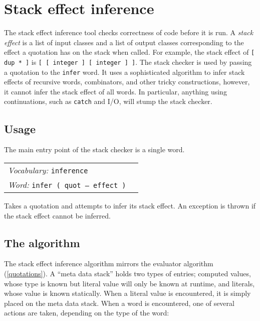 \documentclass{book}
\newcommand{\vocabulary}[1]{\emph{Vocabulary:} \texttt{#1}&\\}
\newcommand{\ordinaryword}[2]{\index{\texttt{#1}}\emph{Word:} \texttt{#2}&\\}
\newcommand{\wordtable}[1]{


\begin{tabularx}{12cm}{lX}
\hline
#1
\hline
\end{tabularx}

}
\begin{document}
\chapter{Stack effect inference}

The stack effect inference tool checks correctness of code before it is run.
A \emph{stack effect} is a list of input classes and a list of output classes corresponding to
the effect a quotation has on the stack when called. For example, the stack effect of \verb|[ dup * ]| is \verb|[ [ integer ] [ integer ] ]|. The stack checker is used by passing a quotation to the \texttt{infer} word. It uses a sophisticated algorithm to infer stack effects of recursive words, combinators, and other tricky constructions, however, it cannot infer the stack effect of all words. In particular, anything using continuations, such as \texttt{catch} and I/O, will stump the stack checker.

\section{Usage}

The main entry point of the stack checker is a single word.

\wordtable{
\vocabulary{inference}
\ordinaryword{infer}{infer ( quot -- effect )}
}

Takes a quotation and attempts to infer its stack effect. An exception is thrown if the stack effect cannot be inferred.

\section{The algorithm}

The stack effect inference algorithm mirrors the evaluator algorithm (\ref{quotations}). A ``meta data stack'' holds two types of entries; computed values, whose type is known but literal value will only be known at runtime, and literals, whose value is known statically. When a literal value is encountered, it is simply placed on the meta data stack. When a word is encountered, one of several actions are taken, depending on the type of the word:
\end{document}
